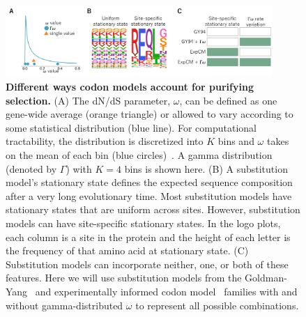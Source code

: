 \documentclass[11pt]{article}
\begin{document}
\newpage 
\begin{figure}[h!]
\centerline{\includegraphics[width=0.90\textwidth]{fig1.pdf}}
\caption{\label{fig:model_feature}
\textbf{Different ways codon models account for purifying selection.}
(A) The dN/dS parameter, $\omega$, can be defined as one gene-wide average (orange triangle) or allowed to vary according to some statistical distribution (blue line). 
For computational tractability, the distribution is discretized into $K$ bins and $\omega$ takes on the mean of each bin (blue circles)~\citep{yang1994maximum,yang2000codon}. 
A gamma distribution (denoted by $\Gamma$) with $K=4$ bins is shown here.
(B) A substitution model's stationary state defines the expected sequence composition after a very long evolutionary time. 
Most substitution models have stationary states that are uniform across sites.
However, substitution models can have site-specific stationary states.
In the logo plots, each column is a site in the protein and the height of each letter is the frequency of that amino acid at stationary state. 
(C) Substitution models can incorporate neither, one, or both of these features.
Here we will use substitution models from the Goldman-Yang~\citep[GY94;][]{goldman1994codon,yang2000codon} and experimentally informed codon model~\citep[ExpCM;][]{hilton2017phydms} families with and without gamma-distributed $\omega$ to represent all possible combinations.
}
\end{figure}
\newpage
\end{document}

